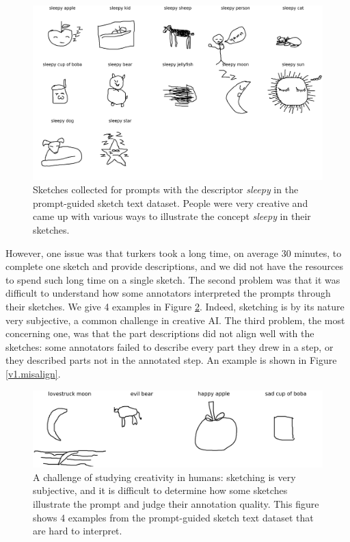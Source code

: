 \begin{figure}[h!]


\centering
\includegraphics[width=\linewidth]{data_collection/v1_sleepy_sketches.png}  
\caption{Sketches collected for prompts with the descriptor \textit{sleepy} in the prompt-guided sketch text dataset. People were very creative and came up with various ways to illustrate the concept \textit{sleepy} in their sketches.}
\label{v1.sleepy}
\end{figure}

However, one issue was that turkers took a long time, on average 30 minutes, to complete one sketch and provide descriptions, and we did not have the resources to spend such long time on a single sketch. 
The second problem was that it was difficult to understand how some annotators interpreted the prompts through their sketches. We give 4 examples in Figure \ref{v1.hard_to_understand}.
Indeed, sketching is by its nature very subjective, a common challenge in creative AI.    
The third problem, the most concerning one, was that the part descriptions did not align well with the sketches: some annotators failed to describe every part they drew in a step, or they described parts not in the annotated step. An example is shown in Figure \ref{v1.misalign}.    

\begin{figure}[!h]
 
\centering
\includegraphics[width=\linewidth]{data_collection/v1_hard_to_understand_sketches.png} 
\caption{A challenge of studying creativity in humans: sketching is very subjective, and it is difficult to determine how some sketches illustrate the prompt and judge their annotation quality. This figure shows 4 examples from the prompt-guided sketch text dataset that are hard to interpret.}
\label{v1.hard_to_understand}
\end{figure}

